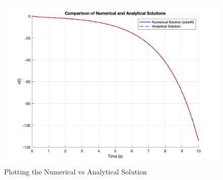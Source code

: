 \documentclass[12pt]{article}
\begin{document}
\begin{enumerate}
\begin{enumerate}
  \begin{figure}[H]
    \centering
    \includegraphics[width=\textwidth]{Figures/figure51.png}
    \caption{Plotting the Numerical vs Analytical Solution}
    \label{fig:figure51}
  \end{figure}

  \end{enumerate}
\newpage

\end{enumerate}


\end{document}
